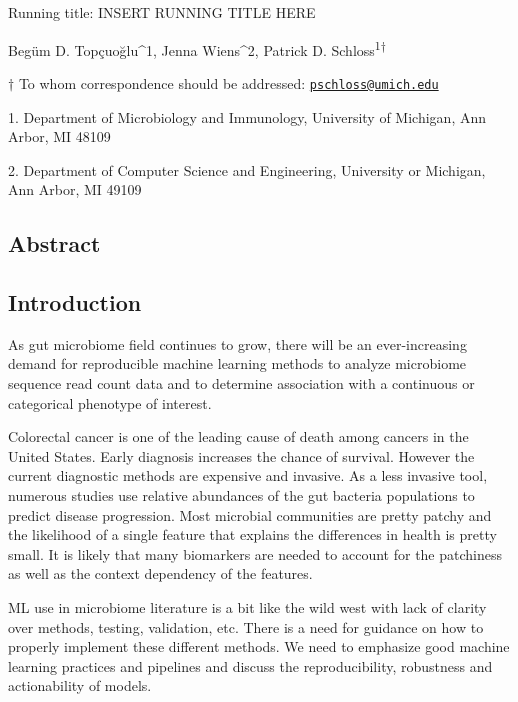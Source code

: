 \documentclass[11pt,]{article}
\begin{document}
Running title: INSERT RUNNING TITLE HERE

\vspace{35mm}

Begüm D. Topçuoğlu\^{}1, Jenna Wiens\^{}2, Patrick D.
Schloss\textsuperscript{1\(\dagger\)}

\vspace{40mm}

\(\dagger\) To whom correspondence should be addressed:
\href{mailto:pschloss@umich.edu}{\nolinkurl{pschloss@umich.edu}}

1. Department of Microbiology and Immunology, University of Michigan,
Ann Arbor, MI 48109

2. Department of Computer Science and Engineering, University or
Michigan, Ann Arbor, MI 49109

\newpage

\linenumbers

\subsection{Abstract}\label{abstract}

\newpage

\subsection{Introduction}\label{introduction}

As gut microbiome field continues to grow, there will be an
ever-increasing demand for reproducible machine learning methods to
analyze microbiome sequence read count data and to determine association
with a continuous or categorical phenotype of interest.

Colorectal cancer is one of the leading cause of death among cancers in
the United States. Early diagnosis increases the chance of survival.
However the current diagnostic methods are expensive and invasive. As a
less invasive tool, numerous studies use relative abundances of the gut
bacteria populations to predict disease progression. Most microbial
communities are pretty patchy and the likelihood of a single feature
that explains the differences in health is pretty small. It is likely
that many biomarkers are needed to account for the patchiness as well as
the context dependency of the features.

ML use in microbiome literature is a bit like the wild west with lack of
clarity over methods, testing, validation, etc. There is a need for
guidance on how to properly implement these different methods. We need
to emphasize good machine learning practices and pipelines and discuss
the reproducibility, robustness and actionability of models.
\end{document}
